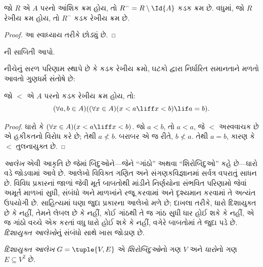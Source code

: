 \begin{prop}
જો $R$ એ $A$ પરનો આંશિક ક્રમ હોય, તો
$R^- = R \setminus \Id{A}$ કડક ક્રમ છે.
વધુમાં, જો $R$ રેખીય ક્રમ હોય, તો $R^-$ કડક રેખીય ક્રમ છે.
\end{prop}

\begin{proof}
આ સ્વાધ્યાય તરીકે છોડ્યું છે.
\end{proof}

\begin{prob}
ની સાબિતી આપો.
\end{prob}

નીચેનું સરળ પરિણામ સ્થાપે છે કે કડક રેખીય ક્રમો,
ઘટકો દ્વારા નિર્ધારિત સમાનતાને મળતો આવતો ગુણધર્મ સંતોષે છે:

\begin{prop}
જો $<$ એ $A$ પરનો કડક રેખીય ક્રમ હોય, તો:
\[
  (\forall a, b \in A)((\forall x \in A)(x < a \liff x < b) \lif a = b).
\]
\end{prop}

\begin{proof}
ધારો કે $(\forall x \in A)(x < a \liff x < b)$.
જો $a < b$, તો $a < a$, જે $<$ અસ્વવાચક છે એ હકીકતનો
વિરોધ કરે છે; તેથી $a \nless b$. બરાબર એ જ રીતે,
$b \nless a$. તેથી $a = b$, કારણ કે $<$ તુલનાયુક્ત છે.
\end{proof}
\endgroup


\begingroup
\makeatletter{}\makeatother

\label{guunit:OLP-0017}


\emph{આલેખ} એવી આકૃતિ છે જેમાં બિંદુઓને—જેને “ગાંઠો” અથવા
“શિરોબિંદુઓ” કહે છે—ધારો વડે જોડવામાં આવે છે.
આલેખો વિવિક્ત ગણિત અને સંગણકવિજ્ઞાનમાં સર્વત્ર વપરાતું સાધન છે.
વિવિધ પ્રકારનાં જાળાં જેવી મૂર્ત બાબતોથી માંડીને નિર્ણયોના
સંભવિત પરિણામો જેવાં અમૂર્ત માળખાં સુધી, સંબંધો અને માળખાંને
રજૂ કરવામાં અને દૃશ્યમાન કરવામાં તે અત્યંત ઉપયોગી છે.
સાહિત્યમાં ઘણા જુદા પ્રકારના આલેખો મળે છે; દાખલા તરીકે,
ધારો દિશાયુક્ત છે કે નહીં, તેમને લેબલ છે કે નહીં, કોઈ ગાંઠથી
તે જ ગાંઠ સુધી ધાર હોઈ શકે કે નહીં, એ જ ગાંઠો વચ્ચે એક કરતાં
વધુ ધારો હોઈ શકે કે નહીં, વગેરે બાબતોમાં તે જુદા પડે છે.
\emph{દિશાયુક્ત આલેખો}નું સંબંધો સાથે ખાસ જોડાણ છે.

\begin{defn}[દિશાયુક્ત આલેખ]
\emph{દિશાયુક્ત આલેખ} $G = \tuple{V, E}$ એ
\emph{શિરોબિંદુઓ}નો ગણ $V$ અને \emph{ધારો}નો ગણ
$E \subseteq V^2$ છે.
\end{defn}

